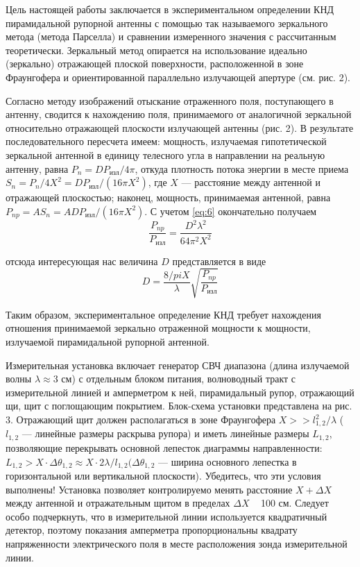 Цель настоящей работы заключается в экспериментальном определении КНД пирамидальной рупорной антенны с помощью так 
называемого зеркального метода (метода Парселла) и сравнении измеренного значения с рассчитанным теоретически. 
Зеркальный метод опирается на использование идеально (зеркально) отражающей плоской поверхности, расположенной в зоне 
Фраунгофера и ориентированной параллельно излучающей апертуре (см. рис. 2).

Согласно методу изображений отыскание отраженного поля, поступающего в антенну, сводится к нахождению поля, 
принимаемого от аналогичной зеркальной относительно отражающей плоскости излучающей антенны (рис. 2). В результате 
последовательного пересчета имеем: мощность, излучаемая гипотетической зеркальной антенной в единицу телесного угла 
в направлении на реальную антенну, равна $P_n = D P_{\text{изл}}/4\pi$, откуда плотность потока энергии в месте приема 
$S_n = P_n/4X^2 = D P_{\text{изл}}/(16\pi X^2)$, где $X$ — расстояние между антенной и отражающей плоскостью; наконец, 
мощность, принимаемая антенной, равна $P_{np} =A S_n =A D P_{\text{изл}}/(16\pi X^2)$. С учетом \ref{eq:6} окончательно 
получаем
\begin{equation}
    \frac{P_{np}}{P_{\text{изл}}} = \frac{D^2\lambda^2}{64\pi^2X^2}
    \label{eq:7}
\end{equation}

отсюда интересующая нас величина $D$ представляется в виде 
\begin{equation}
    D = \frac{8/pi X}{\lambda}\sqrt{\frac{P_{np}}{P_{\text{изл}}}}
    \label{eq:8}
\end{equation}

Таким образом, экспериментальное определение КНД требует нахождения отношения принимаемой зеркально отраженной мощности 
к мощности, излучаемой пирамидальной рупорной антенной. 

Измерительная установка включает генератор СВЧ диапазона (длина излучаемой волны $\lambda \approx$3 см) с отдельным 
блоком питания, волноводный тракт с измерительной линией и амперметром к ней, пирамидальный рупор, отражающий щи, 
щит с поглощающим покрытием. Блок-схема установки представлена на рис. 3. Отражающий щит должен располагаться в зоне 
Фраунгофера $X>>l_{1,2}^2/\lambda$ ($l_{1,2}$ — линейные размеры раскрыва рупора) и иметь линейные 
размеры $L_{1,2}$, позволяющие перекрывать основной лепесток диаграммы направленности:
 $ L_{1,2}>X \cdot \Delta \theta_{1,2} \approx X \cdot 2 \lambda / l_{1,2} (\Delta \theta_{1,2}$
— ширина основного лепестка в горизонтальной или вертикальной плоскости). Убедитесь, что эти условия выполнены! 
Установка позволяет контролируемо менять расстояние $X + \Delta X$ между антенной и отражательным щитом в пределах $\Delta X$ ~ 100 см. 
Следует особо подчеркнуть, что в измерительной линии используется квадратичный детектор, поэтому показания амперметра 
пропорциональны квадрату напряженности электрического поля в месте расположения зонда измерительной линии.

